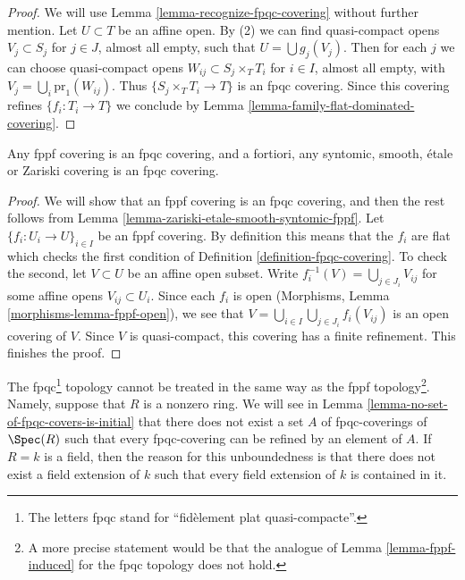 \begin{proof}
We will use Lemma \ref{lemma-recognize-fpqc-covering} without further
mention. Let $U \subset T$ be an affine open. By (2) we can find
quasi-compact opens $V_j \subset S_j$ for $j \in J$, almost all empty, such that
$U = \bigcup g_j(V_j)$. Then for each $j$ we can choose quasi-compact
opens $W_{ij} \subset S_j \times_T T_i$ for $i \in I$, almost all empty,
with $V_j = \bigcup_i \text{pr}_1(W_{ij})$. Thus
$\{S_j \times_T T_i \to T\}$ is an fpqc covering.
Since this covering refines $\{f_i : T_i \to T\}$ we conclude by
Lemma \ref{lemma-family-flat-dominated-covering}.
\end{proof}

\begin{lemma}
\label{lemma-zariski-etale-smooth-syntomic-fppf-fpqc}
Any fppf covering is an fpqc covering, and a fortiori,
any syntomic, smooth, \'etale or Zariski covering is an fpqc covering.
\end{lemma}

\begin{proof}
We will show that an fppf covering is an fpqc covering, and then the
rest follows from
Lemma \ref{lemma-zariski-etale-smooth-syntomic-fppf}.
Let $\{f_i : U_i \to U\}_{i \in I}$ be an fppf covering.
By definition this means that the $f_i$ are flat which checks the first
condition of Definition \ref{definition-fpqc-covering}. To check the
second, let $V \subset U$ be an affine open subset.
Write $f_i^{-1}(V) = \bigcup_{j \in J_i} V_{ij}$
for some affine opens $V_{ij} \subset U_i$. Since each $f_i$ is open
(Morphisms, Lemma \ref{morphisms-lemma-fppf-open}), we see that
$V = \bigcup_{i\in I} \bigcup_{j \in J_i} f_i(V_{ij})$
is an open covering of $V$.
Since $V$ is quasi-compact, this covering has a finite
refinement. This finishes the proof.
\end{proof}

\noindent
The fpqc\footnote{The letters fpqc stand for
``fid\`element plat quasi-compacte''.}
topology cannot be treated in the same way as the fppf
topology\footnote{A more precise statement would be that the analogue of
Lemma \ref{lemma-fppf-induced} for the fpqc topology does not hold.}.
Namely, suppose that $R$ is a nonzero ring. We will see in
Lemma \ref{lemma-no-set-of-fpqc-covers-is-initial}
that there does not exist a set $A$ of fpqc-coverings of $\Spec(R)$
such that every fpqc-covering can be refined by an element of $A$.
If $R = k$ is a field, then the reason for this unboundedness is that
there does not exist a field extension of $k$ such that every field extension
of $k$ is contained in it.

